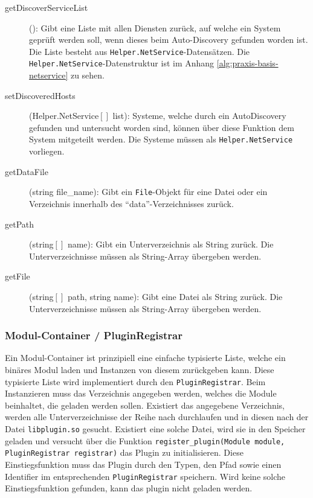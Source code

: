 \begin{description}
\item[getDiscoverServiceList](): Gibt eine Liste mit allen Diensten zur\"uck, auf welche ein System gepr\"uft werden soll, wenn dieses beim Auto-Discovery gefunden worden ist. Die Liste besteht aus \texttt{Helper.NetService}-Datens\"atzen. Die \texttt{Helper.NetService}-Datenstruktur ist im Anhang \ref{alg:praxis-basis-netservice} zu sehen.

\item[setDiscoveredHosts](Helper.NetService$\left[ \right]$ list): Systeme, welche durch ein AutoDiscovery gefunden und untersucht worden sind, k\"onnen \"uber diese Funktion dem System mitgeteilt werden. Die Systeme m\"ussen als \texttt{Helper.NetService} vorliegen.

\item[getDataFile](string file\_name): Gibt ein \texttt{File}-Objekt f\"ur eine Datei oder ein Verzeichnis innerhalb des "`data"'-Verzeichnisses zur\"uck.

\item[getPath](string$\left[ \right]$ name): Gibt ein Unterverzeichnis als String zur\"uck. Die Unterverzeichnisse m\"ussen als String-Array \"ubergeben werden.

\item[getFile](string$\left[ \right]$ path, string name): Gibt eine Datei als String zur\"uck. Die Unterverzeichnisse m\"ussen als String-Array \"ubergeben werden.
\end{description}

\subsubsection{Modul-Container / PluginRegistrar} \label{sec:praxis-basis-kernel-container}
Ein Modul-Container ist prinzipiell eine einfache typisierte Liste, welche ein bin\"ares Modul laden und Instanzen von diesem zur\"uckgeben kann. Diese typisierte Liste wird implementiert durch den \texttt{PluginRegistrar}. Beim Instanzieren muss das Verzeichnis angegeben werden, welches die Module beinhaltet, die geladen werden sollen. Existiert das angegebene Verzeichnis, werden alle Unterverzeichnisse der Reihe nach durchlaufen und in diesen nach der Datei \texttt{libplugin.so} gesucht. Existiert eine solche Datei, wird sie in den Speicher geladen und versucht \"uber die Funktion \texttt{register\_plugin(Module module, PluginRegistrar registrar)} das Plugin zu initialisieren. Diese Einstiegsfunktion muss das Plugin durch den Typen, den Pfad sowie einen Identifier im entsprechenden \texttt{PluginRegistrar} speichern. Wird keine solche Einstiegsfunktion gefunden, kann das plugin nicht geladen werden.

